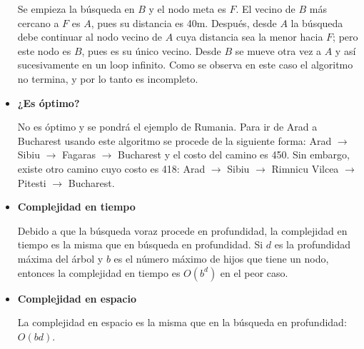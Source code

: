 \documentclass{article}
\begin{document}
\begin{itemize}
Se empieza la búsqueda en $B$ y el nodo meta es $F$. El vecino de $B$ más cercano a $F$ es $A$, pues su distancia es 40m. Después, desde $A$ la búsqueda debe continuar al nodo vecino de $A$ cuya distancia sea la menor hacia $F$; pero este nodo es $B$, pues es su único vecino. Desde $B$ se mueve otra vez a $A$ y así sucesivamente en un loop infinito. Como se observa en este caso el algoritmo no termina, y por lo tanto es incompleto.

\item \textbf{¿Es óptimo?}

No es óptimo y se pondrá el ejemplo de Rumania. Para ir de Arad a Bucharest usando este algoritmo se procede de la siguiente forma: Arad $\rightarrow$ Sibiu $\rightarrow$ Fagaras $\rightarrow$ Bucharest y el costo del camino es 450. Sin embargo, existe otro camino cuyo costo es 418: Arad $\rightarrow$ Sibiu $\rightarrow$ Rimnicu Vilcea $\rightarrow$ Pitesti $\rightarrow$ Bucharest.

\item \textbf{Complejidad en tiempo}

Debido a que la búsqueda voraz procede en profundidad, la complejidad en tiempo es la misma que en búsqueda en profundidad. Si $d$ es la profundidad máxima del árbol y $b$ es el número máximo de hijos que tiene un nodo, entonces la complejidad en tiempo es $O(b^d)$ en el peor caso.

\item \textbf{Complejidad en espacio}

La complejidad en espacio es la misma que en la búsqueda en profundidad: $O(bd)$.

\end{itemize}
\end{document}
